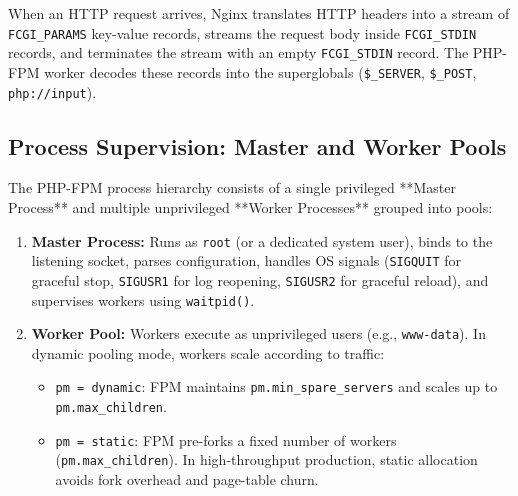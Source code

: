 When an HTTP request arrives, Nginx translates HTTP headers into a stream of \texttt{FCGI\_PARAMS} key-value records, streams the request body inside \texttt{FCGI\_STDIN} records, and terminates the stream with an empty \texttt{FCGI\_STDIN} record. The PHP-FPM worker decodes these records into the superglobals (\texttt{\$\_SERVER}, \texttt{\$\_POST}, \texttt{php://input}).

\subsection{Process Supervision: Master and Worker Pools}

The PHP-FPM process hierarchy consists of a single privileged **Master Process** and multiple unprivileged **Worker Processes** grouped into pools:
\begin{enumerate}[leftmargin=15pt]
  \item \textbf{Master Process:} Runs as \texttt{root} (or a dedicated system user), binds to the listening socket, parses configuration, handles OS signals (\texttt{SIGQUIT} for graceful stop, \texttt{SIGUSR1} for log reopening, \texttt{SIGUSR2} for graceful reload), and supervises workers using \texttt{waitpid()}.
  \item \textbf{Worker Pool:} Workers execute as unprivileged users (e.g., \texttt{www-data}). In dynamic pooling mode, workers scale according to traffic:
  \begin{itemize}
    \item \texttt{pm = dynamic}: FPM maintains \texttt{pm.min\_spare\_servers} and scales up to \texttt{pm.max\_children}.
    \item \texttt{pm = static}: FPM pre-forks a fixed number of workers (\texttt{pm.max\_children}). In high-throughput production, static allocation avoids fork overhead and page-table churn.
  \end{itemize}
\end{enumerate}

